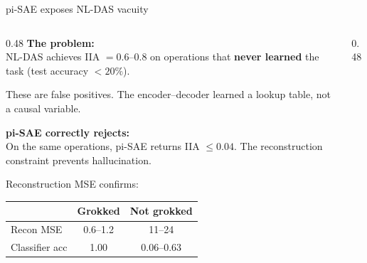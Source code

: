 \documentclass[aspectratio=169,11pt]{beamer}
\begin{document}
\begin{frame}{pi-SAE exposes NL-DAS vacuity}

\begin{columns}[T]
\begin{column}{0.48\textwidth}
\textbf{The problem:}\\[0.3em]
{\small NL-DAS achieves IIA $= 0.6$--$0.8$ on operations that \textbf{never learned} the task (test accuracy $< 20\%$).}

\vspace{0.3em}
{\small These are false positives. The encoder--decoder learned a lookup table, not a causal variable.}

\vspace{0.5em}
\textbf{pi-SAE correctly rejects:}\\[0.3em]
{\small On the same operations, pi-SAE returns IIA $\leq 0.04$. The reconstruction constraint prevents hallucination.}

\vspace{0.3em}
{\small Reconstruction MSE confirms:}\\[0.2em]
{\small\setlength{\tabcolsep}{3pt}
\begin{tabular}{@{}lcc@{}}
& \textbf{Grokked} & \textbf{Not grokked} \\
\midrule
{\small Recon MSE} & 0.6--1.2 & 11--24 \\
{\small Classifier acc} & 1.00 & 0.06--0.63 \\
\end{tabular}}
\end{column}
\begin{column}{0.48\textwidth}
\centering
\vspace{0.5em}
\end{column}
\end{columns}
\end{frame}
\end{document}
